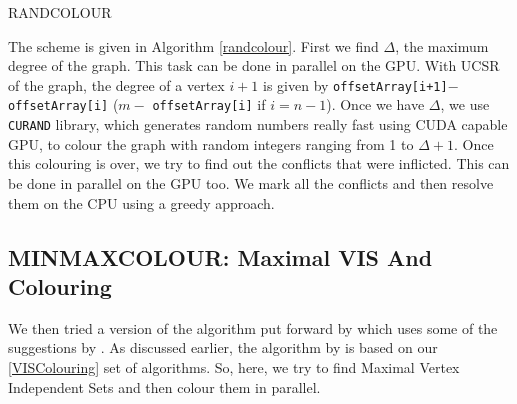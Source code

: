 \documentclass[MTech]{iitmdiss}
\makeatletter
\def\BState{\State\hskip-\ALG@thistlm}
\makeatother
\begin{document}
\begin{algorithm}
\caption{RANDCOLOUR}\label{randcolour}
\end{algorithm}

The scheme is given in Algorithm \ref{randcolour}. First we find $\Delta$, the maximum degree of the graph. This task can be done in parallel on the GPU. With UCSR of the graph, the degree of a vertex $i+1$ is given by \verb|offsetArray[i+1]|$-$\verb+offsetArray[i]+ ($ m - $ \verb+offsetArray[i]+ if $i=n-1$). Once we have $\Delta$, we use \verb+CURAND+ library, which generates random numbers really fast using CUDA capable GPU, to colour the graph with random integers ranging from 1 to $\Delta+1$. Once this colouring is over, we try to find out the conflicts that were inflicted. This can be done in parallel on the GPU too. We mark all the conflicts and then resolve them on the CPU using a greedy approach.

\subsection{MINMAXCOLOUR: Maximal VIS And Colouring}
We then tried a version of the algorithm put forward by \citet{Jones:1993:PGC:153109.153119} which uses some of the suggestions by \citet{cohenefficient}. As discussed earlier, the algorithm by \citet{Jones:1993:PGC:153109.153119} is based on our \ref{VISColouring} set of algorithms. So, here, we try to find Maximal Vertex Independent Sets and then colour them in parallel. 
\end{document}
